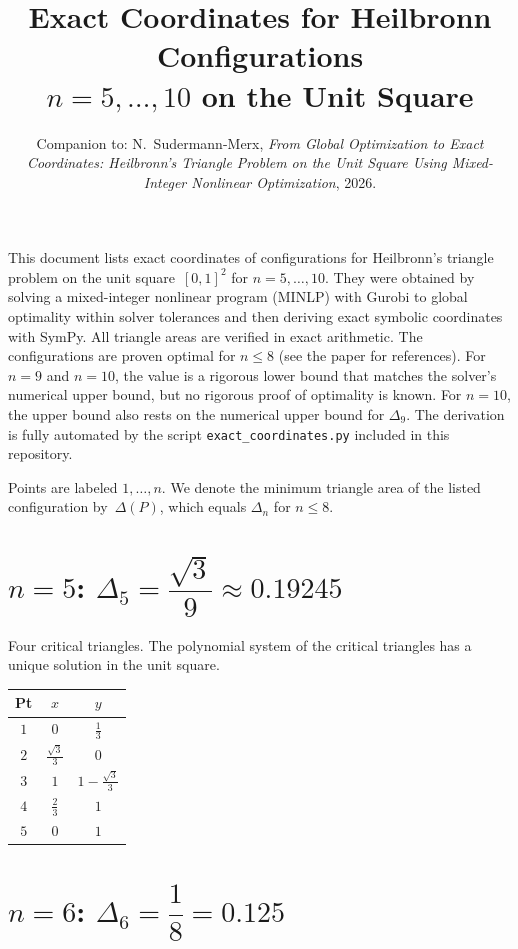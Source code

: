 \documentclass[11pt]{article}
\title{Exact Coordinates for Heilbronn Configurations\\[4pt]
       \large $n = 5, \ldots, 10$ on the Unit Square}
\author{\parbox{\dimexpr\textwidth-2\tabcolsep}{\centering\normalsize Companion to: N.\ Sudermann-Merx, \emph{From Global Optimization to Exact Coordinates:
Heilbronn's Triangle Problem on the Unit Square Using Mixed-Integer Nonlinear Optimization}, 2026.}}
\date{}
\begin{document}
\maketitle

\noindent
This document lists exact coordinates of configurations for
Heilbronn's triangle problem on the unit square~$[0,1]^2$
for $n = 5, \ldots, 10$.
They were obtained by solving a mixed-integer nonlinear program (MINLP)
with Gurobi to global optimality within solver tolerances and then deriving
exact symbolic coordinates with SymPy. All triangle areas are verified in exact
arithmetic. The configurations are proven optimal for $n\le 8$ (see the paper
for references). For $n=9$ and $n=10$, the value is a rigorous lower bound that matches
the solver's numerical upper bound, but no rigorous proof of optimality is known.
For $n=10$, the upper bound also rests on the numerical upper bound for $\Delta_9$.
The derivation is fully automated by the script
\texttt{exact\_coordinates.py} included in this repository.

Points are labeled $1, \ldots, n$.
We denote the minimum triangle area of the listed configuration by~$\Delta(P)$, which equals $\Delta_n$ for $n\le 8$.

\section*{$n = 5$: \quad $\Delta_5 = \dfrac{\sqrt{3}}{9} \approx 0.19245$}

Four critical triangles. The polynomial system of the critical triangles has a unique solution in the unit square.

\begin{center}
\begin{tabular}{c c c}
\toprule
Pt & $x$ & $y$ \\
\midrule
$1$ & $0$ & $\frac{1}{3}$ \\[4pt]
$2$ & $\frac{\sqrt{3}}{3}$ & $0$ \\[4pt]
$3$ & $1$ & $1 - \frac{\sqrt{3}}{3}$ \\[4pt]
$4$ & $\frac{2}{3}$ & $1$ \\[4pt]
$5$ & $0$ & $1$ \\
\bottomrule
\end{tabular}
\end{center}

\section*{$n = 6$: \quad $\Delta_6 = \dfrac{1}{8} = 0.125$}
\end{document}

